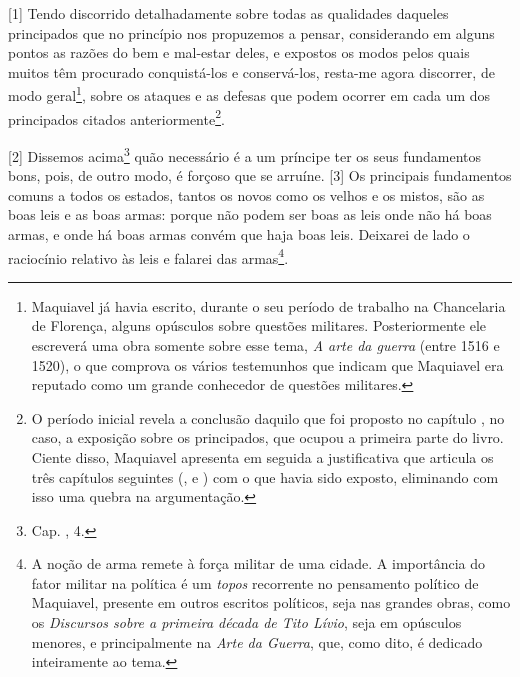 {[}1{]} Tendo discorrido detalhadamente sobre todas as qualidades
daqueles principados que no princípio nos propuzemos a pensar,
considerando em alguns pontos as razões do bem e mal-estar deles, e
expostos os modos pelos quais muitos têm procurado conquistá-los e
conservá-los, resta-me agora discorrer, de modo geral\footnote{Maquiavel
  já havia escrito, durante o seu período de trabalho na Chancelaria de
  Florença, alguns opúsculos sobre questões militares. Posteriormente
  ele escreverá uma obra somente sobre esse tema, \emph{A arte da
  guerra} (entre 1516 e 1520), o que comprova os vários testemunhos que
  indicam que Maquiavel era reputado como um grande conhecedor de
  questões militares.}, sobre os ataques e as defesas que podem ocorrer
em cada um dos principados citados anteriormente\footnote{O período
  inicial revela a conclusão daquilo que foi proposto no capítulo , no
  caso, a exposição sobre os principados, que ocupou a primeira parte do
  livro. Ciente disso, Maquiavel apresenta em seguida a justificativa
  que articula os três capítulos seguintes (,  e ) com o que
  havia sido exposto, eliminando com isso uma quebra na argumentação.}.

{[}2{]} Dissemos acima\footnote{Cap. , 4.} quão necessário é a um
príncipe ter os seus fundamentos bons, pois, de outro modo, é forçoso
que se arruíne. {[}3{]} Os principais fundamentos comuns a todos os
estados, tantos os novos como os velhos e os mistos, são as boas leis e
as boas armas: porque não podem ser boas as leis onde não há boas armas,
e onde há boas armas convém que haja boas leis. Deixarei de lado o
raciocínio relativo às leis e falarei das armas\footnote{A noção de arma
  remete à força militar de uma cidade. A importância do fator militar
  na política é um \emph{topos} recorrente no pensamento político de
  Maquiavel, presente em outros escritos políticos, seja nas grandes
  obras, como os \emph{Discursos sobre a primeira década de Tito Lívio},
  seja em opúsculos menores, e principalmente na \emph{Arte da Guerra},
  que, como dito, é dedicado inteiramente ao tema.}.

